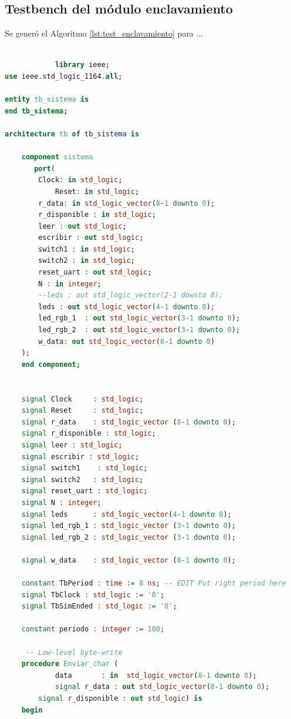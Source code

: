 	\subsection{Testbench del módulo enclavamiento}
			
		Se generó el Algoritmo \ref{lst:test_enclavamiento} para ...
		
			
		\begin{lstlisting}[language = vhdl,caption=Testbench del módulo enclavamiento,label={lst:test_separador}] 
				
			library ieee;
use ieee.std_logic_1164.all;

entity tb_sistema is
end tb_sistema;

architecture tb of tb_sistema is

    component sistema
       port(
		Clock: in std_logic;
        	Reset: in std_logic;
		r_data: in std_logic_vector(8-1 downto 0);
		r_disponible : in std_logic;
		leer : out std_logic;
		escribir : out std_logic;
		switch1 : in std_logic;
		switch2 : in std_logic;
		reset_uart : out std_logic;
		N : in integer;
		--leds : out std_logic_vector(2-1 downto 0);
		leds : out std_logic_vector(4-1 downto 0);
		led_rgb_1  : out std_logic_vector(3-1 downto 0);
		led_rgb_2  : out std_logic_vector(3-1 downto 0);
		w_data: out std_logic_vector(8-1 downto 0)
	);
    end component;


    signal Clock     : std_logic;
    signal Reset     : std_logic;
    signal r_data    : std_logic_vector (8-1 downto 0);
    signal r_disponible : std_logic;
    signal leer : std_logic;
    signal escribir : std_logic;
    signal switch1    : std_logic;
    signal switch2   : std_logic;
    signal reset_uart : std_logic;
    signal N : integer;
    signal leds      : std_logic_vector(4-1 downto 0);
    signal led_rgb_1 : std_logic_vector (3-1 downto 0);
    signal led_rgb_2 : std_logic_vector (3-1 downto 0);

    signal w_data    : std_logic_vector (8-1 downto 0);

    constant TbPeriod : time := 8 ns; -- EDIT Put right period here
    signal TbClock : std_logic := '0';
    signal TbSimEnded : std_logic := '0';

    constant periodo : integer := 100;

	 -- Low-level byte-write
  	procedure Enviar_char (
    		data       : in  std_logic_vector(8-1 downto 0);
    		signal r_data : out std_logic_vector(8-1 downto 0);
		signal r_disponible : out std_logic) is
  	begin


\end{lstlisting}
